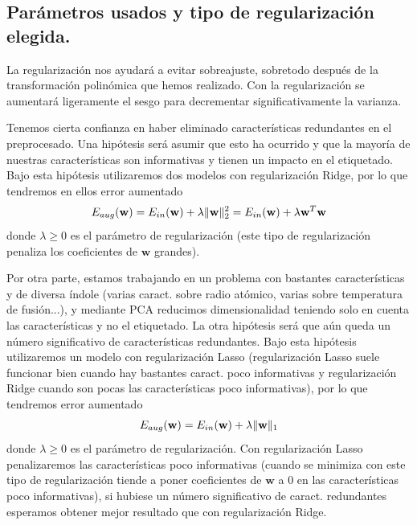 \documentclass[11pt,a4paper]{article}
\DeclarePairedDelimiter{\norm}{\lVert}{\rVert}
\theoremstyle{definition}
\begin{document}
	\subsection{Parámetros usados y tipo de regularización elegida.}
	La regularización nos ayudará a evitar sobreajuste, sobretodo después de la transformación polinómica que hemos realizado. Con la regularización se aumentará ligeramente el sesgo para decrementar significativamente la varianza.
	
	Tenemos cierta confianza en haber eliminado características redundantes en el preprocesado. Una hipótesis será asumir que esto ha ocurrido y que la mayoría de nuestras características son informativas y tienen un impacto en el etiquetado. Bajo esta hipótesis utilizaremos dos modelos con regularización Ridge, por lo que tendremos en ellos error aumentado
	$$E_{aug}(\mathbf{w})=E_{in}(\mathbf{w})+\lambda \norm{\mathbf{w}}_2^2 = E_{in}(\mathbf{w})+\lambda \mathbf{w}^T\mathbf{w}$$
	donde $\lambda \geq 0$ es el parámetro de regularización (este tipo de regularización penaliza los coeficientes de $\mathbf{w}$ grandes).  
	
	Por otra parte, estamos trabajando en un problema con bastantes características y de diversa índole (varias caract. sobre radio atómico, varias sobre temperatura de fusión...), y mediante PCA reducimos dimensionalidad teniendo solo en cuenta las características y no el etiquetado. %
	La otra hipótesis será que aún queda un número significativo de características redundantes. Bajo esta hipótesis utilizaremos un modelo con regularización Lasso (regularización Lasso suele funcionar bien cuando hay bastantes caract. poco informativas y regularización Ridge cuando son pocas las características poco informativas), por lo que tendremos error aumentado 
	$$E_{aug}(\mathbf{w})=E_{in}(\mathbf{w})+\lambda \norm{\mathbf{w}}_1$$
	donde $\lambda \geq 0$ es el parámetro de regularización. Con regularización Lasso penalizaremos las características poco informativas (cuando se minimiza con este tipo de regularización tiende a poner coeficientes de $\mathbf{w}$ a 0 en las características poco informativas), si hubiese un número significativo de caract. redundantes esperamos obtener mejor resultado que con regularización Ridge. \\
	
\end{document}
